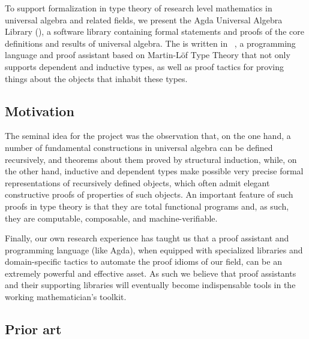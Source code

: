 To support formalization in type theory of research level mathematics in universal algebra and related fields, we present the Agda Universal Algebra Library (\agdaualib), a software library containing formal statements and proofs of the core definitions and results of universal algebra. 
The \ualib is written in \agda~\cite{Norell:2009}, a programming language and proof assistant based on Martin-L\"of Type Theory that not only supports dependent and inductive types, as well as proof tactics for proving things about the objects that inhabit these types.

\subsection{Motivation}\label{sec:motivation}
The seminal idea for the \agdaualib project was the observation that, on the one hand, a number of fundamental constructions in universal algebra can be defined recursively, and theorems about them proved by structural induction, while, on the other hand, inductive and dependent types make possible very precise formal representations of recursively defined objects, which often admit elegant constructive proofs of properties of such objects.  An important feature of such proofs in type theory is that they are total functional programs and, as such, they are computable, composable, and machine-verifiable.

Finally, our own research experience has taught us that a proof assistant and programming language (like Agda), when equipped with specialized libraries and domain-specific tactics to automate the proof idioms of our field, can be an extremely powerful and effective asset. As such we believe that proof assistants and their supporting libraries will eventually become indispensable tools in the working mathematician's toolkit.


\subsection{Prior art}\label{sec:prior-art}

